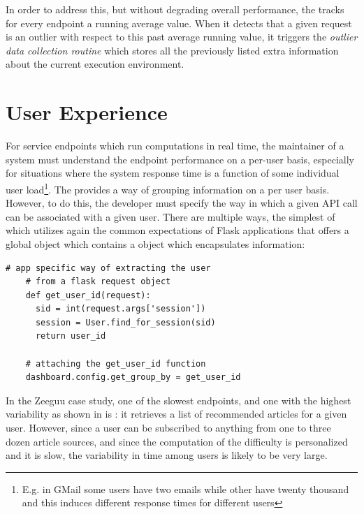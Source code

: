 \documentclass[conference]{IEEEtran}
\begin{document}
  In order to address this, but without degrading overall performance, the \tool tracks for every endpoint a running average value. When it detects that a given request is an outlier with respect to this past average running value, it triggers the {\em outlier data collection routine} which stores all the previously listed extra information about the current execution environment. 


\section {User Experience}
\label{sec:user}

  For service endpoints which run computations in real time, the maintainer of a system must understand the endpoint performance on a per-user basis, especially for situations where the system response time is a function of some individual user load\footnote{E.g. in GMail some users have two emails while other have twenty thousand and this induces different response times for different users}.
%
  The \tool provides a way of grouping information on a per user basis. However, to do this, the developer must specify the way in which a given API call can be associated with a given user. There are multiple ways, the simplest of which utilizes again the common expectations of Flask applications that offers a global  object which contains a  object which encapsulates information: 

  \begin{lstlisting}[style=custompython]  
    # app specific way of extracting the user
    # from a flask request object    
    def get_user_id(request):
      sid = int(request.args['session'])
      session = User.find_for_session(sid)
      return user_id

    # attaching the get_user_id function
    dashboard.config.get_group_by = get_user_id

  \end{lstlisting}

  In the Zeeguu case study, one of the slowest endpoints, and one with the highest variability as shown in  is \epFeedItems: it retrieves a list of recommended articles for a given user. However, since a user can be subscribed to anything from one to three dozen article sources, and since the computation of the difficulty is personalized and it is slow, the variability in time among users is likely to be very large. 
\end{document}
